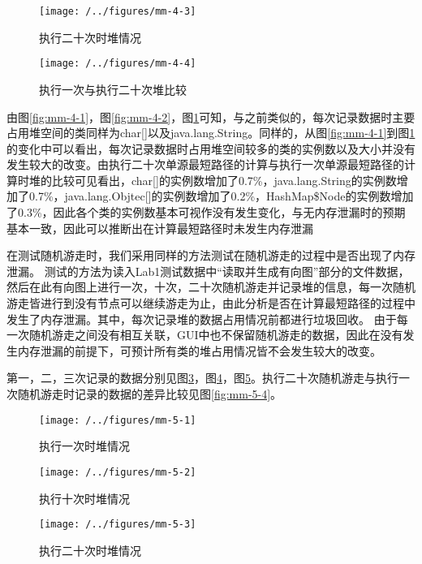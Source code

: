 \begin{figure}
\centering
\texttt{[image: /../figures/mm-4-3]}
\caption{执行二十次时堆情况}
\label{fig:mm-4-3}
\end{figure}

\begin{figure}
\centering
\texttt{[image: /../figures/mm-4-4]}
\caption{执行一次与执行二十次堆比较}
\label{fig:mm-4-4}
\end{figure}

由图\ref{fig:mm-4-1}，图\ref{fig:mm-4-2}，图\ref{fig:mm-4-3}可知，与之前类似的，每次记录数据时主要占用堆空间的类同样为char[]以及java.lang.String。同样的，从图\ref{fig:mm-4-1}到图\ref{fig:mm-4-3}的变化中可以看出，每次记录数据时占用堆空间较多的类的实例数以及大小并没有发生较大的改变。由执行二十次单源最短路径的计算与执行一次单源最短路径的计算时堆的比较可见看出，char[]的实例数增加了0.7\%，java.lang.String的实例数增加了0.7\%，java.lang.Objtec[]的实例数增加了0.2\%，HashMap\$Node的实例数增加了0.3\%，因此各个类的实例数基本可视作没有发生变化，与无内存泄漏时的预期基本一致，因此可以推断出在计算最短路径时未发生内存泄漏

在测试随机游走时，我们采用同样的方法测试在随机游走的过程中是否出现了内存泄漏。
测试的方法为读入Lab1测试数据中“读取并生成有向图”部分的文件数据，然后在此有向图上进行一次，十次，二十次随机游走并记录堆的信息，每一次随机游走皆进行到没有节点可以继续游走为止，由此分析是否在计算最短路径的过程中发生了内存泄漏。其中，每次记录堆的数据占用情况前都进行垃圾回收。
由于每一次随机游走之间没有相互关联，GUI中也不保留随机游走的数据，因此在没有发生内存泄漏的前提下，可预计所有类的堆占用情况皆不会发生较大的改变。

第一，二，三次记录的数据分别见图\ref{fig:mm-5-1}，图\ref{fig:mm-5-2}，图\ref{fig:mm-5-3}。执行二十次随机游走与执行一次随机游走时记录的数据的差异比较见图\ref{fig:mm-5-4}。

\begin{figure}
\centering
\texttt{[image: /../figures/mm-5-1]}
\caption{执行一次时堆情况}
\label{fig:mm-5-1}
\end{figure}

\begin{figure}
\centering
\texttt{[image: /../figures/mm-5-2]}
\caption{执行十次时堆情况}
\label{fig:mm-5-2}
\end{figure}

\begin{figure}
\centering
\texttt{[image: /../figures/mm-5-3]}
\caption{执行二十次时堆情况}
\label{fig:mm-5-3}
\end{figure}

